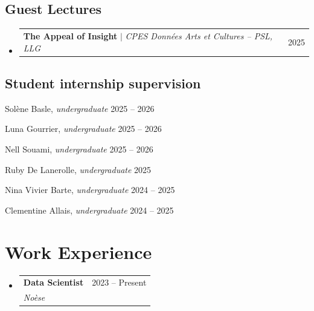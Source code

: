 \documentclass[letterpaper,11pt]{article}
\makeatletter
\newcommand{\resumeItem}[1]{
  \item\small{
    {#1 \vspace{-2pt}}
  }
}
\newcommand{\resumeItemWithYear}[3][ ]{ %
  \item\small{
    #2 \hfill {\small #3} \\
    #1
  }
}
\newcommand{\resumeSubheading}[4]{
  \vspace{1pt}\item
    \begin{tabular*}{0.97\textwidth}[t]{l@{\extracolsep{\fill}}r}
      \textbf{#1} & #2 \\
      \textit{\small#3} & \textit{\small #4} \\
    \end{tabular*}\vspace{-7pt}
}
\newcommand{\resumeSubSubheading}[2]{
    \item
    \begin{tabular*}{0.97\textwidth}{l@{\extracolsep{\fill}}r}
      \textit{\small#1} & \textit{\small #2} \\
    \end{tabular*}\vspace{-7pt}
}
\newcommand{\resumePublicationHeading}[1]{
  \vspace{5pt} %
  \noindent\textbf{\small #1} %
  \vspace{2pt} %
}
\newcommand{\resumeProjectHeading}[2]{
    \item
    \begin{tabular*}{0.97\textwidth}{l@{\extracolsep{\fill}}r}
      \small#1 & #2 \\
    \end{tabular*}\vspace{-7pt}
}
\newcommand{\resumeSubHeadingListStart}{\begin{itemize}[leftmargin=0.15in, label={}]}
\newcommand{\resumeSubHeadingListEnd}{\end{itemize}}
\newcommand{\resumeItemListStart}{\begin{itemize}}
\newcommand{\resumeItemListEnd}{\end{itemize}\vspace{-5pt}}
\makeatother
\begin{document}
\subsection*{Guest Lectures}
    \resumeSubHeadingListStart
    \resumeProjectHeading
        {\textbf{The Appeal of Insight} $|$ \emph{CPES Données Arts et Cultures -- PSL, LLG}}{2025}
    \resumeSubHeadingListEnd


\subsection*{Student internship supervision}

\begin{etaremune}
    \resumeItemWithYear{Solène Basle, \textit{undergraduate}}{2025 -- 2026}
    \resumeItemWithYear{Luna Gourrier, \textit{undergraduate}}{2025 -- 2026}
    \resumeItemWithYear{Nell Souami, \textit{undergraduate}}{2025 -- 2026}
    \resumeItemWithYear{Ruby De Lanerolle, \textit{undergraduate}}{2025}
    \resumeItemWithYear{Nina Vivier Barte, \textit{undergraduate}}{2024 -- 2025}
    \resumeItemWithYear{Clementine Allais, \textit{undergraduate}}{2024 -- 2025}
\end{etaremune}

\section{Work Experience}
  \resumeSubHeadingListStart

    \resumeSubheading
      {Data Scientist}{2023 -- Present}
      {Noèse}{}

      
  \resumeSubHeadingListEnd
\end{document}
